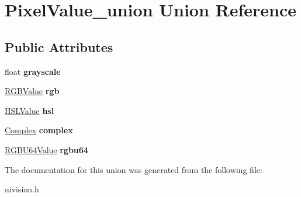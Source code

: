 \hypertarget{unionPixelValue__union}{
\section{PixelValue\_\-union Union Reference}
\label{unionPixelValue__union}
}
\subsection*{Public Attributes}
\begin{DoxyCompactItemize}
\item 
\hypertarget{unionPixelValue__union_aacaaa6cde302e77de252d9924b9c69ab}{
float {\bfseries grayscale}}
\label{unionPixelValue__union_aacaaa6cde302e77de252d9924b9c69ab}

\item 
\hypertarget{unionPixelValue__union_ab6f7394fc48fcc82b8f398055d7cb561}{
\hyperlink{structRGBValue__struct}{RGBValue} {\bfseries rgb}}
\label{unionPixelValue__union_ab6f7394fc48fcc82b8f398055d7cb561}

\item 
\hypertarget{unionPixelValue__union_a250bee75a3db8009e312a4be2e17b1b8}{
\hyperlink{structHSLValue__struct}{HSLValue} {\bfseries hsl}}
\label{unionPixelValue__union_a250bee75a3db8009e312a4be2e17b1b8}

\item 
\hypertarget{unionPixelValue__union_aab44189546d41a8a2dfb12c185bda1c6}{
\hyperlink{structComplex__struct}{Complex} {\bfseries complex}}
\label{unionPixelValue__union_aab44189546d41a8a2dfb12c185bda1c6}

\item 
\hypertarget{unionPixelValue__union_ac7b195a0d42f1c4b5f156304d473e18c}{
\hyperlink{structRGBU64Value__struct}{RGBU64Value} {\bfseries rgbu64}}
\label{unionPixelValue__union_ac7b195a0d42f1c4b5f156304d473e18c}

\end{DoxyCompactItemize}


The documentation for this union was generated from the following file:\begin{DoxyCompactItemize}
\item 
nivision.h\end{DoxyCompactItemize}

